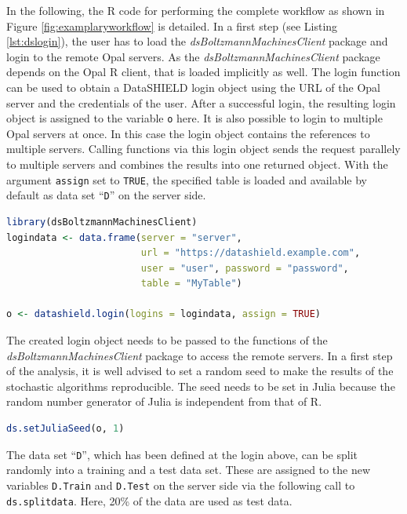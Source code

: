 \documentclass[12pt]{article}
\newcommand{\inlinecode}[1]{\texttt{#1}}
\newcommand{\apkg}[1]{\emph{#1}}
\begin{document}
In the following, the R code for performing the complete workflow as shown in Figure \ref{fig:examplaryworkflow} is detailed.
In a first step (see Listing \ref{lst:dslogin}), the user has to load the \apkg{dsBoltzmannMachinesClient} package and login to the remote Opal servers.
As the \apkg{dsBoltzmannMachinesClient} package depends on the Opal R client, that is loaded implicitly as well.
The login function can be used to obtain a DataSHIELD login object using the URL of the Opal server and the credentials of the user.
After a successful login, the resulting login object is assigned to the variable \inlinecode{o} here.
It is also possible to login to multiple Opal servers at once.
In this case the login object contains the references to multiple servers.
Calling functions via this login object sends the request parallely to multiple servers and  combines the results into one returned object. 
With the argument \inlinecode{assign} set to \inlinecode{TRUE}, the specified table is loaded and available by default as data set ``\inlinecode{D}'' on the server side.

\begin{lstlisting}[language=R,float=!h,caption={Loading package and logging in to the remote servers},label={lst:dslogin}]
library(dsBoltzmannMachinesClient)
logindata <- data.frame(server = "server",
                        url = "https://datashield.example.com",
                        user = "user", password = "password",
                        table = "MyTable")

o <- datashield.login(logins = logindata, assign = TRUE)
\end{lstlisting}

The created login object needs to be passed to the functions of the \apkg{dsBoltzmannMachinesClient} package to access the remote servers.
In a first step of the analysis, it is well advised to set a random seed to make the results of the stochastic algorithms reproducible.
The seed needs to be set in Julia because the random number generator of Julia is independent from that of R.

\begin{lstlisting}[language=R, float=!h]
ds.setJuliaSeed(o, 1)
\end{lstlisting}

The data set ``\inlinecode{D}'', which has been defined at the login above, can be split randomly into a training and a test data set.
These are assigned to the new variables \inlinecode{D.Train} and \inlinecode{D.Test} on the server side via the following call to \inlinecode{ds.splitdata}.
Here, 20\% of the data are used as test data.
\end{document}
